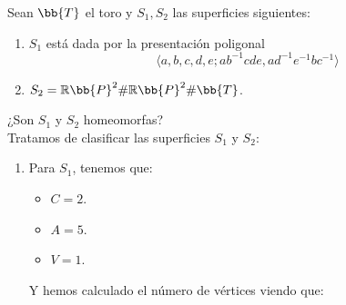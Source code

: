 \documentclass[12pt]{article}
\begin{document}
    \begin{ejercicio} 
        Sean $\bb{T}$ el toro y $S_1,S_2$ las superficies siguientes:
        \begin{enumerate}[label=\alph*)]
            \item $S_1$ está dada por la presentación poligonal
                \begin{equation*}
                    \langle a,b,c,d,e;ab^{-1}cde, ad^{-1}e^{-1}bc^{-1} \rangle 
                \end{equation*}
            \item $S_2 = \mathbb{R}\bb{P}^2\# \mathbb{R}\bb{P}^2\#\bb{T}$.
        \end{enumerate}
        ¿Son $S_1$ y $S_2$ homeomorfas?\\

        \noindent
        Tratamos de clasificar las superficies $S_1$ y $S_2$:
        \begin{enumerate}[label=\alph*)]
            \item Para $S_1$, tenemos que:
                \begin{itemize}
                    \item $C = 2$.
                    \item $A = 5$.
                    \item $V = 1$.
                \end{itemize}
                Y hemos calculado el número de vértices viendo que:
                \begin{figure}[H]
                    \centering
                    \begin{minipage}{0.24\textwidth}
                        \centering
\end{minipage}
\end{figure}
\end{enumerate}
\end{ejercicio}
\end{document}
